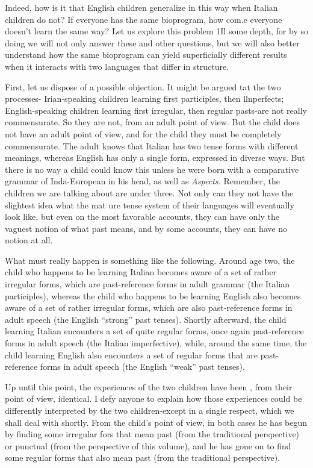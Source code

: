 Indeed, how is it that English children generalize in this way when Italian children do not? If everyone has the same bioprogram, how com.e everyone doesn't learn the same way? Let us explore this problem 1Il some depth, for by so doing we will not only answer these and other questions, but we will also better understand how the same
bioprogram can yield superficially different results when it interacts with two languages that differ in structure.

First, let us dispose of a possible objection. It might be argued tat the two processes- Irian-speaking children learning first parti\-ciples, then llnperfects; English-speaking children learning first irregular, then regular pasts{}-are not really commensurate. So they are not, from an adult point of view. But the child does not have an adult point of view, and for the child they must be completely commen\-surate. The adult knows that Italian has two tense forms with different meanings, whereas English has only a single form, expressed in diverse ways. But there is no way a child could know this unless he were born with a comparative grammar of Inda-European in his head, as well as \textit{Aspects. }Remember, the children we are talking about are under three. Not only can they not have the slightest idea what the mat ure tense system of their languages will eventually look like, but even on the most favorable accounts, they can have only the vaguest notion of
what past means, and by some accounts, they can have no notion at all.


What must really happen is something like the following. Around age two, the child who happens to be learning Italian becomes aware of a set of rather irregular forms, which are past-reference forms in adult grammar (the Italian participles), whereas the child who happens to be learning English also becomes aware of a set of rather irregular forms, which are also past-reference forms in adult speech (the English ``strong'' past tenses). Shortly afterward, the child learning Italian encounters a set of quite regular forms, once again past-reference forms in adult speech (the Italian imperfective), while, around the same time, the child learning English also encounters a set of regular forms that are past-reference forms in adult speech (the English ``weak'' past tenses).

Up until this point, the experiences of the two children have been , from their point of view, identical. I defy anyone to explain how those experiences could be differently interpreted by the two children-except in a single respect, which we shall deal with shortly. From the child's point of view, in both cases he has begun by finding some irregular fors that mean past (from the traditional perspective) or punctual (from the perspective of this volume), and he has gone on to find some regular forms that also mean past (from the traditional perspective).

